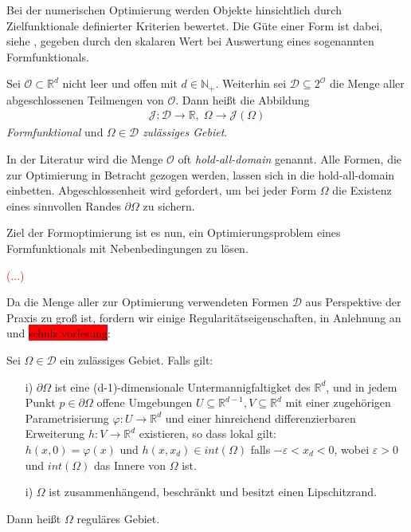 Bei der numerischen Optimierung werden Objekte hinsichtlich durch Zielfunktionale definierter Kriterien bewertet. Die Güte einer Form ist dabei, siehe \cite{shape_space}, gegeben durch den skalaren Wert bei Auswertung eines sogenannten Formfunktionals.

\begin{defi}[Formfunktional] %
Sei $\mathcal{O}\subset \mathbb{R}^d$ nicht leer und offen mit $d \in \mathbb{N}_+$. Weiterhin sei $\mathcal{D} \subseteq 2^{\mathcal{O}}$ die Menge aller abgeschlossenen Teilmengen von $\mathcal{O}$. Dann heißt die Abbildung 
\begin{align*}
\mathcal{J}: \mathcal{D} \rightarrow \mathbb{R},\; \Omega \rightarrow \mathcal{J}(\Omega)
\end{align*}
\textit{Formfunktional} und $\Omega \in \mathcal{D}$ \textit{zulässiges Gebiet}.
\end{defi}

In der Literatur wird die Menge $\mathcal{O}$ oft \textit{hold-all-domain} genannt. Alle Formen, die zur Optimierung in Betracht gezogen werden, lassen sich in die hold-all-domain einbetten. Abgeschlossenheit wird gefordert, um bei jeder Form $\Omega$ die Existenz eines sinnvollen Randes $\partial\Omega$ zu sichern. 

Ziel der Formoptimierung ist es nun, ein Optimierungsproblem eines Formfunktionals mit Nebenbedingungen zu lösen.

\textcolor{red}{(...)}

Da die Menge aller zur Optimierung verwendeten Formen $\mathcal{D}$ aus Perspektive der Praxis zu groß ist, fordern wir einige Regularitätseigenschaften, in Anlehnung an \cite{Shape_diff} und \colorbox{red}{schulz vorlesung}:

\begin{defi}\label{regu}
Sei $\Omega \in \mathcal{D}$ ein zulässiges Gebiet. Falls gilt:
\begin{itemize}
\item[i)] $\partial \Omega$ ist eine (d-1)-dimensionale Untermannigfaltigket des $\mathbb{R}^d$, und in jedem Punkt $p\in \partial \Omega$ offene Umgebungen $U\subseteq \mathbb{R}^{d-1}, V\subseteq \mathbb{R}^d$ mit einer zugehörigen Parametrisierung $\varphi: U \rightarrow \mathbb{R}^d$ und einer hinreichend differenzierbaren Erweiterung $h: V \rightarrow \mathbb{R}^d$ existieren, so dass lokal gilt:\\
$h(x,0) = \varphi(x)$ und $h(x,x_d) \in int(\Omega)$ falls $-\varepsilon < x_d < 0$, wobei $\varepsilon > 0$ und $int(\Omega)$ das Innere von $\Omega$ ist.
\item[i)] $\Omega$ ist zusammenhängend, beschränkt und besitzt einen Lipschitzrand.
\end{itemize}
Dann heißt $\Omega$ reguläres Gebiet.
\end{defi}

